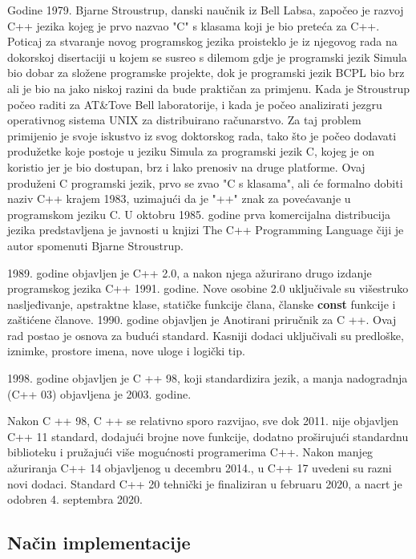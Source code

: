 \documentclass[11pt]{book}
\begin{document}
Godine 1979.  Bjarne Stroustrup, danski naučnik iz Bell Labsa, započeo je razvoj C++ jezika kojeg je prvo nazvao "C" s klasama koji je bio preteća za C++. Poticaj za stvaranje novog programskog jezika proisteklo je iz njegovog rada na dokorskoj disertaciji u kojem se susreo s dilemom gdje je programski jezik Simula bio dobar za složene programske projekte, dok je  programski jezik BCPL  bio  brz  ali  je  bio na  jako  niskoj  razini  da bude praktičan  za primjenu.  Kada  je  Stroustrup  počeo  raditi  za AT\&Tove Bell laboratorije,  i  kada  je  počeo analizirati  jezgru  operativnog  sistema  UNIX  za  distribuirano  računarstvo.  Za  taj  problem primijenio je svoje iskustvo iz svog doktorskog rada, tako što je počeo dodavati produžetke koje postoje u jeziku Simula za programski jezik C, kojeg je on koristio jer je bio dostupan, brz i lako prenosiv na druge platforme. Ovaj produženi C programski jezik, prvo se zvao "C s klasama", ali će formalno dobiti naziv C++ krajem 1983, uzimajući da je "++" znak za povećavanje u programskom  jeziku  C.  U  oktobru 1985. godine  prva  komercijalna  distribucija  jezika predstavljena  je  javnosti  u  knjizi The  C++ Programming  Language čiji  je  autor  spomenuti Bjarne Stroustrup.

1989. godine objavljen je C++ 2.0, a nakon njega ažurirano drugo izdanje programskog jezika C++ 1991. godine. Nove osobine 2.0 uključivale su višestruko nasljeđivanje, apstraktne klase, statičke funkcije člana, članske \textbf{const} funkcije i zaštićene članove. 1990. godine objavljen je Anotirani priručnik za C ++. Ovaj rad postao je osnova za budući standard. Kasniji dodaci uključivali su predloške, iznimke, prostore imena, nove uloge i logički tip.

1998. godine objavljen je C ++ 98, koji standardizira jezik, a manja nadogradnja (C++ 03) objavljena je 2003. godine.

Nakon C ++ 98, C ++ se relativno sporo razvijao, sve dok 2011. nije objavljen C++ 11 standard, dodajući brojne nove funkcije, dodatno proširujući standardnu biblioteku i pružajući više mogućnosti programerima C++. Nakon manjeg ažuriranja C++ 14 objavljenog u decembru 2014., u C++ 17 uvedeni su razni novi dodaci. Standard C++ 20 tehnički je finaliziran u februaru 2020, a nacrt je odobren 4. septembra 2020.

\subsection {Način implementacije}
\end{document}
